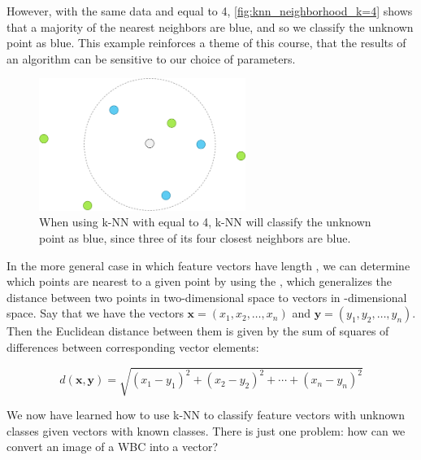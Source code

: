 However, with the same data and  equal to 4, \autoref{fig:knn_neighborhood_k=4} shows that a majority of the  nearest neighbors are blue, and so we classify the unknown point as blue. This example reinforces a theme of this course, that the results of an algorithm can be sensitive to our choice of parameters.\\

\begin{figure}[h]
\centering
\mySfFamily
\includegraphics[width = 0.6\textwidth]{../images/knn_neighborhood_k=4.png}
\caption{When using k-NN with  equal to 4, k-NN will classify the unknown point as blue, since three of its four closest neighbors are blue.}
\label{fig:knn_neighborhood_k=4}
\end{figure}

\begin{qbox}[%
When \textvar{k} = 2 or \textvar{k} = 6 for the classification of the point in \autoref{fig:knn_neighborhood}, note that we obtain a tie in the number of points from each known class belonging to the \textvar{k} nearest neighbors of a point with unknown class. How could we break ties in k-NN?
]\end{qbox}

In the more general case in which feature vectors have length , we can determine which points are nearest to a given point by using the , which generalizes the distance between two points in two-dimensional space to vectors in -dimensional space. Say that we have the vectors $\mathbf{x} = (x_1, x_2, \ldots, x_n)$ and $\mathbf{y} = (y_1, y_2, \ldots, y_n)$. Then the Euclidean distance between them is given by the sum of squares of differences between corresponding vector elements:

$$d(\mathbf{x}, \mathbf{y}) = \sqrt{(x_1 - y_1)^2 + (x_2 - y_2)^2 + \cdots + (x_n-y_n)^2}$$

We now have learned how to use k-NN to classify feature vectors with unknown classes given vectors with known classes. There is just one problem: how can we convert an image of a WBC into a vector?

